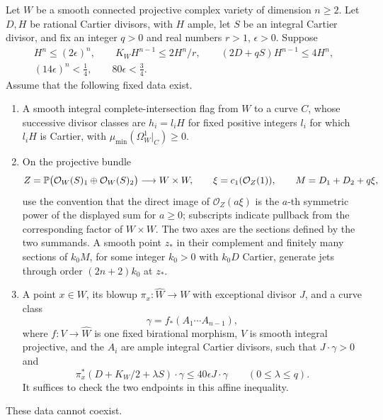 \begin{theorem}
\label{thm:finite-data}
Let $W$ be a smooth connected projective complex variety of
dimension $n\ge2$. Let $D,H$ be rational Cartier divisors, with
$H$ ample, let $S$ be an integral Cartier divisor, and fix an
integer $q>0$ and real numbers $r>1$, $\epsilon>0$. Suppose
\begin{equation}\label{fr:intersection-bounds}
 \begin{gathered}
 H^n\le(2\epsilon)^n,\qquad
 K_WH^{n-1}\le2H^n/r,\qquad
 (2D+qS)H^{n-1}\le4H^n,\\
 (14\epsilon)^n<\tfrac14,\qquad 80\epsilon<\tfrac34.
 \end{gathered}
\end{equation}
Assume that the following fixed data exist.
\begin{enumerate}
\renewcommand{\labelenumi}{\textup{(\roman{enumi})}}
\item A smooth integral complete-intersection flag from $W$ to
a curve $C$, whose successive divisor classes are $h_i=l_iH$
for fixed positive integers $l_i$ for which $l_iH$ is Cartier, with
$\mu_{\min}(\Omega_W^1|_C)\ge0$.
\item On the projective bundle
\[
 Z=\mathbb P\bigl(\mathcal O_W(S)_1\oplus
                         \mathcal O_W(S)_2\bigr)\longrightarrow W\times W,
 \qquad \xi=c_1(\mathcal O_Z(1)),\qquad M=D_1+D_2+q\xi,
\]
use the convention that the direct image of $\mathcal O_Z(a\xi)$
is the $a$-th symmetric power of the displayed sum for $a\ge0$;
subscripts indicate pullback from the corresponding factor of
$W\times W$. The two axes are the sections defined by the two
summands. A smooth point $z_*$ in their complement and finitely many
sections of $k_0M$, for some integer $k_0>0$ with $k_0D$ Cartier,
generate jets through order $(2n+2)k_0$ at $z_*$.
\item A point $x\in W$, its blowup
$\pi_x:\widehat W\to W$ with exceptional divisor $J$, and a
curve class
\[
 \gamma=f_*(A_1\cdots A_{n-1}),
\]
where $f:V\to\widehat W$ is one fixed birational morphism,
$V$ is smooth integral projective, and the $A_i$ are ample
integral Cartier divisors, such that $J\cdot\gamma>0$ and
\begin{equation}\label{fr:movable-input}
 \pi_x^*(D+K_W/2+\lambda S)\cdot\gamma
 \le40\epsilon J\cdot\gamma\qquad(0\le\lambda\le q).
\end{equation}
It suffices to check the two endpoints in this affine inequality.
\end{enumerate}
These data cannot coexist.
\end{theorem}

